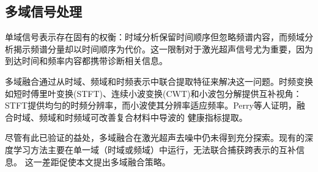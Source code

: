 \subsection{多域信号处理}
\label{sec:multi-domain}

单域信号表示存在固有的权衡：时域分析保留时间顺序但忽略频谱内容，而频域分析揭示频谱分量却以时间顺序为代价\cite{yang2023unsupervised}。这一限制对于激光超声信号尤为重要，因为到达时间和频率内容都携带诊断相关信息。

多域融合通过从时域、频域和时频表示中联合提取特征来解决这一问题\cite{perry2026health}。时频变换如短时傅里叶变换(STFT)、连续小波变换(CWT)和小波包分解提供互补视角：STFT提供均匀的时频分辨率，而小波使其分辨率适应频率\cite{chen2019wavelet}。Perry等人证明，融合时域、频域和时频域可改善复合材料中导波的 健康指标提取\cite{perry2026health}。

尽管有此已验证的益处，多域融合在激光超声去噪中仍未得到充分探索。现有的深度学习方法主要在单一域（时域或频域）中运行，无法联合捕获跨表示的互补信息。
这一差距促使本文提出多域融合策略。
